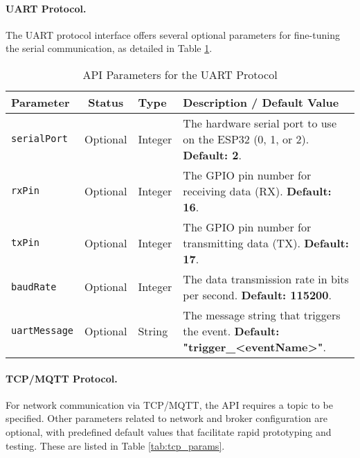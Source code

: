 \paragraph{UART Protocol.} The UART protocol interface offers several optional parameters for fine-tuning the serial communication, as detailed in Table \ref{tab:uart_params}.

\begin{table}[h!]
    \centering
    \caption{API Parameters for the UART Protocol}
    \label{tab:uart_params}
    \begin{tabular}{|l|c|l|p{6cm}|}
        \hline
        \textbf{Parameter} & \textbf{Status} & \textbf{Type} & \textbf{Description / Default Value} \\ \hline
        \texttt{serialPort} & Optional & Integer & The hardware serial port to use on the ESP32 (0, 1, or 2). \textbf{Default: 2}. \\ \hline
        \texttt{rxPin} & Optional & Integer & The GPIO pin number for receiving data (RX). \textbf{Default: 16}. \\ \hline
        \texttt{txPin} & Optional & Integer & The GPIO pin number for transmitting data (TX). \textbf{Default: 17}. \\ \hline
        \texttt{baudRate} & Optional & Integer & The data transmission rate in bits per second. \textbf{Default: 115200}. \\ \hline
        \texttt{uartMessage} & Optional & String & The message string that triggers the event. \textbf{Default: "trigger\_<eventName>"}. \\ \hline
    \end{tabular}
\end{table}

\paragraph{TCP/MQTT Protocol.} For network communication via TCP/MQTT, the API requires a topic to be specified. Other parameters related to network and broker configuration are optional, with predefined default values that facilitate rapid prototyping and testing. These are listed in Table \ref{tab:tcp_params}.

